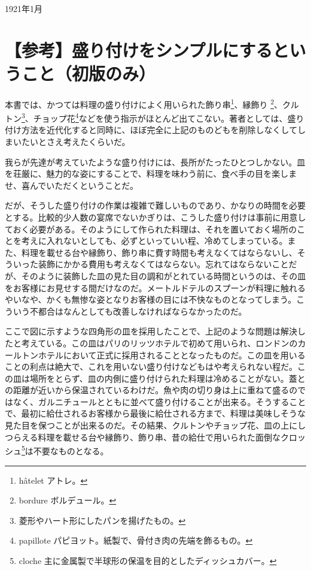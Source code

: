 \begin{Main}
\begin{flushright}
1921年1月
\end{flushright}

\newpage
\small
{}

\hypertarget{remarque-sur-la-simplification-des-procedes-de-dressage}{%
\section{【参考】盛り付けをシンプルにするということ（初版のみ）}\label{remarque-sur-la-simplification-des-procedes-de-dressage}}

本書では、かつては料理の盛り付けによく用いられた飾り串\footnote{hâtelet
  アトレ。}、縁飾り \footnote{bordure ボルデュール。}、クルトン\footnote{菱形やハート形にしたパンを揚げたもの。}、チョップ花\footnote{papillote
  パピヨット。紙製で、骨付き肉の先端を飾るもの。}などを使う指示がほとんど出てこない。著者としては、盛り付け方法を近代化すると同時に、ほぼ完全に上記のものどもを削除しなくしてしまいたいとさえ考えたくらいだ。

我らが先達が考えていたような盛り付けには、長所がたったひとつしかない。皿を荘厳に、魅力的な姿にすることで、料理を味わう前に、食べ手の目を楽しませ、喜んでいただくということだ。

だが、そうした盛り付けの作業は複雑で難しいものであり、かなりの時間を必要とする。比較的少人数の宴席でないかぎりは、こうした盛り付けは事前に用意しておく必要がある。そのようにして作られた料理は、それを置いておく場所のことを考えに入れないとしても、必ずといっていい程、冷めてしまっている。また、料理を載せる台や縁飾り、飾り串に費す時間も考えなくてはならないし、そういった装飾にかかる費用も考えなくてはならない。忘れてはならないことだが、そのように装飾した皿の見た目の調和がとれている時間というのは、その皿をお客様にお見せする間だけなのだ。メートルドテルのスプーンが料理に触れるやいなや、かくも無惨な姿となりお客様の目には不快なものとなってしまう。こういう不都合はなんとしても改善しなければならなかったのだ。

ここで図に示すような四角形の皿を採用したことで、上記のような問題は解決したと考えている。この皿はパリのリッツホテルで初めて用いられ、ロンドンのカールトンホテルにおいて正式に採用されることとなったものだ。この皿を用いることの利点は絶大で、これを用いない盛り付けなどもはや考えられない程だ。この皿は場所をとらず、皿の内側に盛り付けられた料理は冷めることがない。蓋との距離が近いから保温されているわけだ。魚や肉の切り身は上に重ねて盛るのではなく、ガルニチュールとともに並べて盛り付けることが出来る。そうすることで、最初に給仕されるお客様から最後に給仕される方まで、料理は美味しそうな見た目を保つことが出来るのだ。その結果、クルトンやチョップ花、皿の上にしつらえる料理を載せる台や縁飾り、飾り串、昔の給仕で用いられた面倒なクロッシュ\footnote{cloche
  主に金属製で半球形の保温を目的としたディッシュカバー。}は不要なものとなる。


\end{Main}
